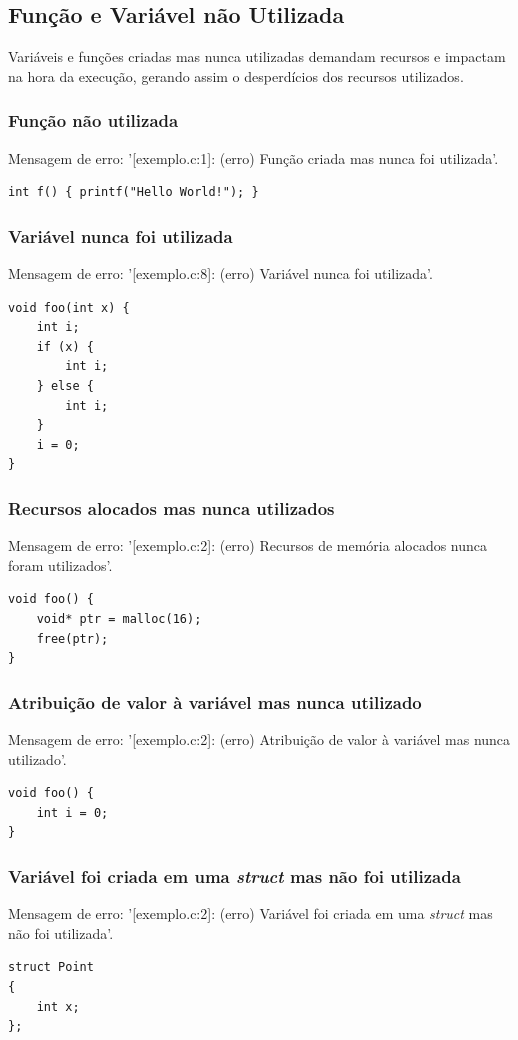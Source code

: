\documentclass[12pt,a4paper]{report}
\begin{document}
\subsection{Função e Variável não Utilizada}
Variáveis e funções criadas mas nunca utilizadas demandam recursos e impactam na hora da execução, gerando assim o desperdícios dos recursos utilizados.
\subsubsection{Função não utilizada}
Mensagem de erro: '[exemplo.c:1]: (erro) Função criada mas nunca foi utilizada'.
\begin{lstlisting}[style=CStyle]
int f() { printf("Hello World!"); }
\end{lstlisting}

\subsubsection{Variável nunca foi utilizada}
Mensagem de erro: '[exemplo.c:8]: (erro) Variável nunca foi utilizada'.
\begin{lstlisting}[style=CStyle]
void foo(int x) {
    int i;
    if (x) {
        int i;
    } else {
        int i;
    }
    i = 0;
}
\end{lstlisting}

\subsubsection{Recursos alocados mas nunca utilizados}
Mensagem de erro: '[exemplo.c:2]: (erro) Recursos de memória alocados nunca foram utilizados'.
\begin{lstlisting}[style=CStyle]
void foo() {
    void* ptr = malloc(16);
    free(ptr);
}
\end{lstlisting}

\subsubsection{Atribuição de valor à variável mas nunca utilizado}
Mensagem de erro: '[exemplo.c:2]: (erro) Atribuição de valor à variável mas nunca utilizado'.
\begin{lstlisting}[style=CStyle]
void foo() {
    int i = 0;
}
\end{lstlisting}

\subsubsection{Variável foi criada em uma \textit{struct} mas não foi utilizada}
Mensagem de erro: '[exemplo.c:2]: (erro) Variável foi criada em uma \textit{struct} mas não foi utilizada'.
\begin{lstlisting}[style=CStyle]
struct Point
{
    int x;
};
\end{lstlisting}
\end{document}
